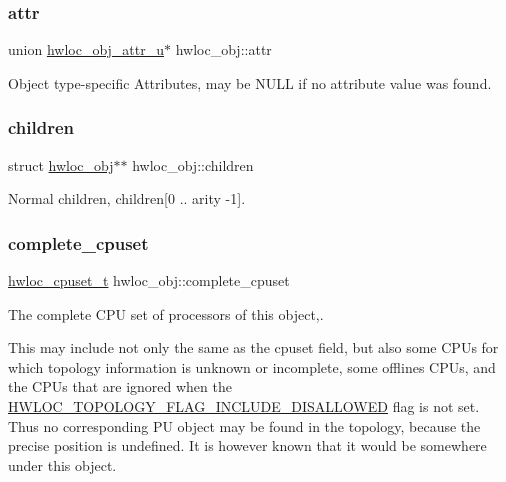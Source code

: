\mbox{\label{a00238_accd40e29f71f19e88db62ea3df02adc8}} 
\subsubsection{\texorpdfstring{attr}{attr}}
{\footnotesize\ttfamily union \hyperlink{a00242}{hwloc\+\_\+obj\+\_\+attr\+\_\+u}$\ast$ hwloc\+\_\+obj\+::attr}



Object type-\/specific Attributes, may be {\ttfamily N\+U\+LL} if no attribute value was found. 

\mbox{\label{a00238_a04d05403da37bfe17cd63b7c7dd07b1f}} 
\subsubsection{\texorpdfstring{children}{children}}
{\footnotesize\ttfamily struct \hyperlink{a00238}{hwloc\+\_\+obj}$\ast$$\ast$ hwloc\+\_\+obj\+::children}



Normal children, {\ttfamily children}\mbox{[}0 .. arity -\/1\mbox{]}. 

\mbox{\label{a00238_a91788a9da687beb7224cc1fd7b75208c}} 
\subsubsection{\texorpdfstring{complete\+\_\+cpuset}{complete\_cpuset}}
{\footnotesize\ttfamily \hyperlink{a00183_ga4bbf39b68b6f568fb92739e7c0ea7801}{hwloc\+\_\+cpuset\+\_\+t} hwloc\+\_\+obj\+::complete\+\_\+cpuset}



The complete C\+PU set of processors of this object,. 

This may include not only the same as the cpuset field, but also some C\+P\+Us for which topology information is unknown or incomplete, some offlines C\+P\+Us, and the C\+P\+Us that are ignored when the \hyperlink{a00193_ggada025d3ec20b4b420f8038d23d6e7bdea10907044bbb306fd0dc76acf046d9258}{H\+W\+L\+O\+C\+\_\+\+T\+O\+P\+O\+L\+O\+G\+Y\+\_\+\+F\+L\+A\+G\+\_\+\+I\+N\+C\+L\+U\+D\+E\+\_\+\+D\+I\+S\+A\+L\+L\+O\+W\+ED} flag is not set. Thus no corresponding PU object may be found in the topology, because the precise position is undefined. It is however known that it would be somewhere under this object.

